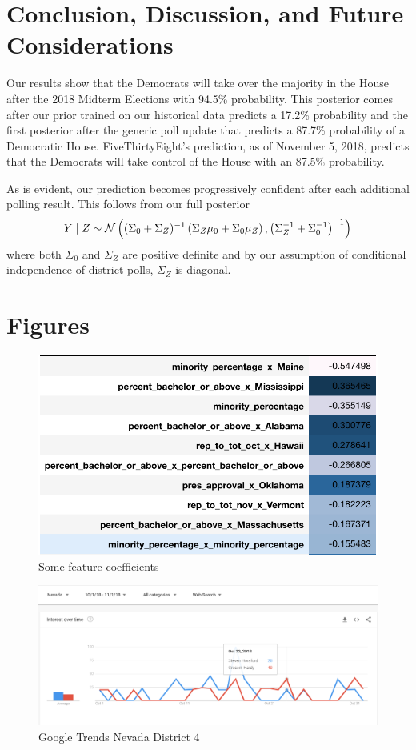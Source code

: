 \documentclass[11pt]{article}
\begin{document}
\section{Conclusion, Discussion, and Future Considerations}
\label{sec:conc} 

Our results show that the Democrats will take over the majority in the House after the 2018 Midterm Elections with 94.5\% probability. This posterior comes after our prior trained on our historical data predicts a 17.2\% probability and the first posterior after the generic poll update that predicts a 87.7\% probability of a Democratic House. FiveThirtyEight's prediction, as of November 5, 2018, predicts that the Democrats will take control of the House with an 87.5\% probability.

As is evident, our prediction becomes progressively confident after each additional polling result. This follows from our full posterior \[
Y\mid Z \sim \mathcal{N}\left({(\Sigma_0 + \Sigma_Z)^{-1} \left({\Sigma_Z\mu_0 + \Sigma_0 \mu_Z}\right), \left({\Sigma_Z^{-1} + \Sigma_0^{-1}}\right)^{-1}}\right)\] where both $\Sigma_0$  and $\Sigma_Z$ are positive definite and by our assumption of conditional independence of district polls, $\Sigma_Z$ is diagonal.


\section{Figures}
\label{sec:figures}

\begin{figure}[tbh]
  \centering
  \includegraphics[scale=0.8]{feature_coeff}
  \caption{Some feature coefficients}
  \label{fig:feature}
\end{figure}

 \begin{figure}[tbh]
  \centering
  \includegraphics[scale=0.4]{google_trends_ex}
  \caption{Google Trends Nevada District 4}
  \label{fig:trends}
\end{figure}
\end{document}
